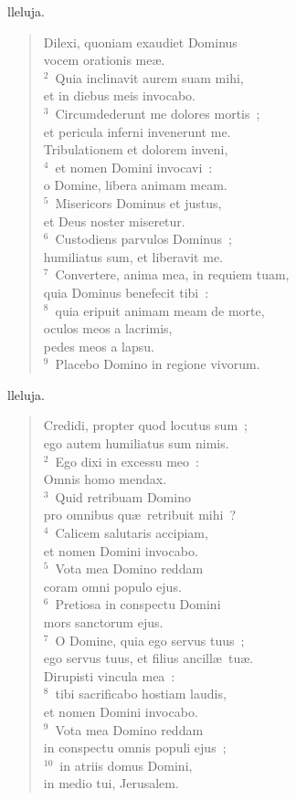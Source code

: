 \bchapter[Psalm]
lleluja. \begin{verse}Dilexi, quoniam exaudiet Dominus\\ vocem orationis me\ae .\\
${}^{2}$~Quia inclinavit aurem suam mihi,\\ et in diebus meis invocabo.\\
${}^{3}$~Circumdederunt me dolores mortis~;\\ et pericula inferni invenerunt me.\\ Tribulationem et dolorem inveni,\\
${}^{4}$~et nomen Domini invocavi~:\\ o Domine, libera animam meam.\\
${}^{5}$~Misericors Dominus et justus,\\ et Deus noster miseretur.\\
${}^{6}$~Custodiens parvulos Dominus~;\\ humiliatus sum, et liberavit me.\\
${}^{7}$~Convertere, anima mea, in requiem tuam,\\ quia Dominus benefecit tibi~:\\
${}^{8}$~quia eripuit animam meam de morte,\\ oculos meos a lacrimis,\\ pedes meos a lapsu.\\
${}^{9}$~Placebo Domino in regione vivorum.\end{verse}



\bchapter[Psalm]
lleluja. \begin{verse}Credidi, propter quod locutus sum~;\\ ego autem humiliatus sum nimis.\\
${}^{2}$~Ego dixi in excessu meo~:\\ Omnis homo mendax.\\
${}^{3}$~Quid retribuam Domino\\ pro omnibus qu\ae\ retribuit mihi~?\\
${}^{4}$~Calicem salutaris accipiam,\\ et nomen Domini invocabo.\\
${}^{5}$~Vota mea Domino reddam\\ coram omni populo ejus.\\
${}^{6}$~Pretiosa in conspectu Domini\\ mors sanctorum ejus.\\
${}^{7}$~O Domine, quia ego servus tuus~;\\ ego servus tuus, et filius ancill\ae\ tu\ae .\\ Dirupisti vincula mea~:\\
${}^{8}$~tibi sacrificabo hostiam laudis,\\ et nomen Domini invocabo.\\
${}^{9}$~Vota mea Domino reddam\\ in conspectu omnis populi ejus~;\\
${}^{10}$~in atriis domus Domini,\\ in medio tui, Jerusalem.\end{verse}



